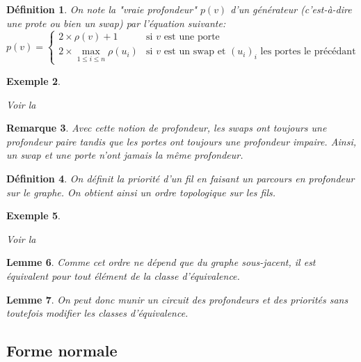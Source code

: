 \documentclass[12pt, a4paper]{article}
\newtheorem{definition}{Définition}[subsection]
\newtheorem{lemma}[definition]{Lemme}
\newtheorem{remark}[definition]{Remarque}
\newtheorem{example}[definition]{Exemple}
\begin{document}
\begin{definition}
    On note la "vraie profondeur" $p(v)$ d'un générateur (c'est-à-dire une prote ou bien un swap) par l'équation suivante:
    \[
    p(v) = \begin{cases}
        2 \times \rho(v) + 1 & \text{si } v \text{ est une porte}\\
        2 \times \max_{1\le i\le n} \rho(u_i) & \text{si } v \text{ est un swap et } (u_i)_i \text{ les portes le précédant}
    \end{cases}
    \]
\end{definition}

\begin{example}
    \label{ex:true_depth}

    Voir la \hyperref[ann:true_depth]{}
\end{example}

\begin{remark}
    Avec cette notion de profondeur, les swaps ont toujours une profondeur paire tandis que les portes ont toujours une profondeur impaire. Ainsi, un swap et une porte n'ont jamais la même profondeur.
\end{remark}

\begin{definition}
    On définit la priorité d'un fil en faisant un parcours en profondeur sur le graphe. On obtient ainsi un ordre topologique sur les fils.
\end{definition}

\begin{example}
    \label{ex:prio}

    Voir la \hyperref[ann:prio]{}
\end{example}

\begin{lemma}
    Comme cet ordre ne dépend que du graphe sous-jacent, il est équivalent pour tout élément de la classe d'équivalence.
\end{lemma}

\begin{lemma}
    On peut donc munir un circuit des profondeurs et des priorités sans toutefois modifier les classes d'équivalence.
\end{lemma}

\subsection{Forme normale}
\end{document}
